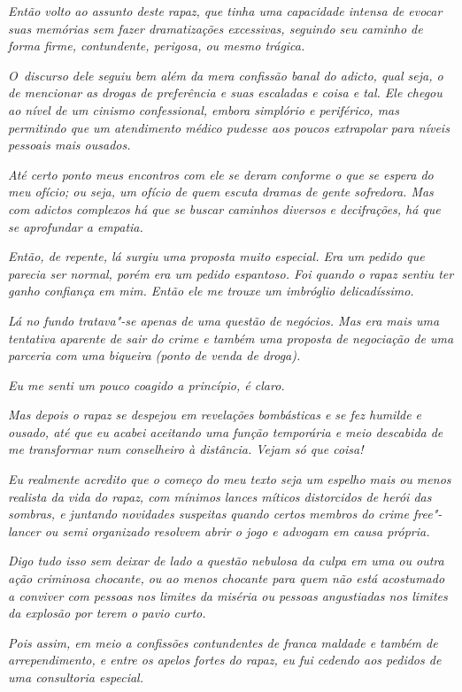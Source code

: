 \emph{Então volto ao assunto deste rapaz, que tinha uma capacidade
intensa de evocar suas memórias sem fazer dramatizações excessivas,
seguindo seu caminho de forma firme, contundente, perigosa, ou mesmo
trágica.}~

\emph{O~discurso dele seguiu bem além da mera confissão banal do adicto,
qual seja, o de mencionar as drogas de preferência e suas escaladas e
coisa e tal. Ele chegou ao nível de um cinismo confessional, embora
simplório e periférico, mas permitindo que um atendimento médico pudesse
aos poucos extrapolar para níveis pessoais mais ousados.}~

\emph{Até certo ponto meus encontros com ele se deram conforme o que se
espera do meu ofício; ou seja, um ofício de quem escuta dramas de gente
sofredora. Mas com adictos complexos há que se buscar caminhos diversos
e decifrações, há que se aprofundar a empatia.}~

\emph{Então, de repente, lá surgiu uma proposta muito especial. Era um
pedido que parecia ser normal, porém era um pedido espantoso. Foi quando
o rapaz sentiu ter ganho confiança em mim. Então ele me trouxe um
imbróglio delicadíssimo.}~

\emph{Lá no fundo tratava"-se apenas de uma questão de negócios. Mas era
mais uma tentativa aparente de sair do crime e também uma proposta de
negociação de uma parceria com uma biqueira (ponto de venda de droga).}~

\emph{Eu me senti um pouco coagido a princípio, é claro.}~

\emph{Mas depois o rapaz se despejou em revelações bombásticas e se fez
humilde e ousado, até que eu acabei aceitando uma função temporária e
meio descabida de me transformar num conselheiro à distância. Vejam só
que coisa!}

\emph{Eu realmente acredito que o começo do meu texto seja um espelho
mais ou menos realista da vida do rapaz, com mínimos lances míticos
distorcidos de herói das sombras, e juntando novidades suspeitas quando
certos membros do crime free"-lancer ou semi organizado resolvem abrir o
jogo e advogam em causa própria.}~

\emph{Digo tudo isso sem deixar de lado a questão nebulosa da culpa em
uma ou outra ação criminosa chocante, ou ao menos chocante para quem não
está acostumado a conviver com pessoas nos limites da miséria ou pessoas
angustiadas nos limites da explosão por terem o pavio curto.}~

\emph{Pois assim, em meio a confissões contundentes de franca maldade e
também de arrependimento, e entre os apelos fortes do rapaz, eu fui
cedendo aos pedidos de uma consultoria especial.}~

